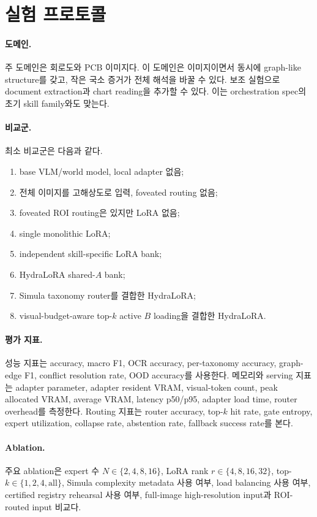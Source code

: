 \documentclass[11pt]{article}
\theoremstyle{definition}
\begin{document}
\section{실험 프로토콜}

\paragraph{도메인.}
주 도메인은 회로도와 PCB 이미지다.
이 도메인은 이미지이면서 동시에 graph-like structure를 갖고, 작은 국소 증거가 전체 해석을 바꿀 수 있다.
보조 실험으로 document extraction과 chart reading을 추가할 수 있다.
이는 orchestration spec의 초기 skill family와도 맞는다.

\paragraph{비교군.}
최소 비교군은 다음과 같다.
\begin{enumerate}[leftmargin=*]
  \item base VLM/world model, local adapter 없음;
  \item 전체 이미지를 고해상도로 입력, foveated routing 없음;
  \item foveated ROI routing은 있지만 LoRA 없음;
  \item single monolithic LoRA;
  \item independent skill-specific LoRA bank;
  \item HydraLoRA shared-$A$ bank;
  \item Simula taxonomy router를 결합한 HydraLoRA;
  \item visual-budget-aware top-$k$ active $B$ loading을 결합한 HydraLoRA.
\end{enumerate}

\paragraph{평가 지표.}
성능 지표는 accuracy, macro F1, OCR accuracy, per-taxonomy accuracy, graph-edge F1, conflict resolution rate, OOD accuracy를 사용한다.
메모리와 serving 지표는 adapter parameter, adapter resident VRAM, visual-token count, peak allocated VRAM, average VRAM, latency p50/p95, adapter load time, router overhead를 측정한다.
Routing 지표는 router accuracy, top-$k$ hit rate, gate entropy, expert utilization, collapse rate, abstention rate, fallback success rate를 본다.

\paragraph{Ablation.}
주요 ablation은 expert 수 $N\in\{2,4,8,16\}$, LoRA rank $r\in\{4,8,16,32\}$, top-$k\in\{1,2,4,\mathrm{all}\}$, Simula complexity metadata 사용 여부, load balancing 사용 여부, certified registry rehearsal 사용 여부, full-image high-resolution input과 ROI-routed input 비교다.
\end{document}
